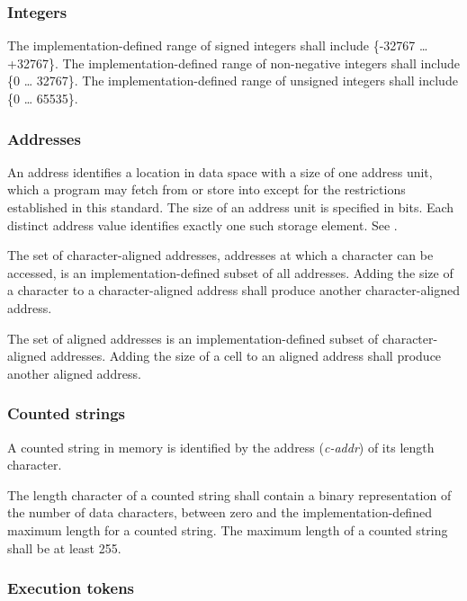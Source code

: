 \subsubsection{Integers} %

The implementation-defined range of signed integers shall include
\{-32767 {\ldots} +32767\}. The im\-ple\-ment\-ation-de\-fined range of
non-negative integers shall include \{0 {\ldots} 32767\}. The
implementation-defined range of unsigned integers shall include
\{0 {\ldots} 65535\}.

\subsubsection{Addresses} %
\label{usage:addr}

An address identifies a location in data space with a size of one
address unit, which a program may fetch from or store into except
for the restrictions established in this standard. The size of an
address unit is specified in bits. Each distinct address value
identifies exactly one such storage element.
See .

The set of character-aligned addresses, addresses at which a
character can be accessed, is an im\-ple\-ment\-ation-de\-fined subset of
all addresses. Adding the size of a character to a character-aligned
address shall produce another character-aligned address.

The set of aligned addresses is an implementation-defined subset
of character-aligned addresses. Adding the size of a cell to an
aligned address shall produce another aligned address.

\subsubsection{Counted strings} %
\label{usage:cstring}

A counted string in memory is identified by the address
(\emph{c-addr}) of its length character.

The length character of a counted string shall contain a binary
representation of the number of data characters, between zero and
the implementation-defined maximum length for a counted string.
The maximum length of a counted string shall be at least 255.

\subsubsection{Execution tokens} %

